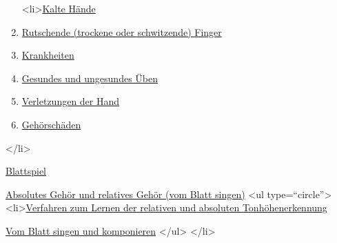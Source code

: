   \begin{enumerate}[label={\alph*.}] 
   <li>\hyperref[c1iii10]{Kalte Hände}
   \item \hyperref[c1iii10rutschen]{Rutschende (trockene oder schwitzende) Finger}
   \item \hyperref[c1iii10krank]{Krankheiten}
   \item \hyperref[c1iii10ungesund]{Gesundes und ungesundes Üben}
   \item \hyperref[c1iii10hand]{Verletzungen der Hand}
   \item \hyperref[c1iii10gehoer]{Gehörschäden}
   \end{enumerate}
 </li>
 \item \hyperref[c1iii11]{Blattspiel}
 \item \hyperref[c1iii12]{Absolutes Gehör und relatives Gehör (vom Blatt singen)}
   <ul type=\enquote{circle}>
    <li>\hyperref[c1iii12tonhoehe]{Verfahren zum Lernen der relativen und absoluten Tonhöhenerkennung}
    \item \hyperref[c1iii12blatt]{Vom Blatt singen und komponieren}
   </ul>
 </li>
